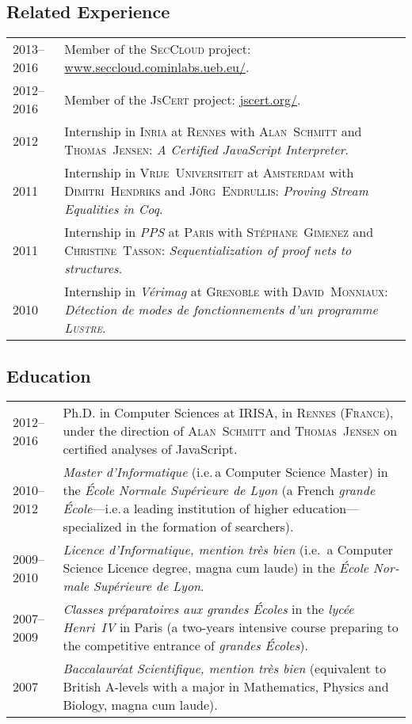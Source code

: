 \documentclass[12pt,a4paper]{article}
\makeatletter
\newcommand{\fr}[1]{\foreignlanguage{french}{\textit{#1}}}
\newcommand{\fr}[1]{\foreignlanguage{francais}{\textit{#1}}}
\newcommand{\ie}{i.e.\,}
\newenvironment{datecvsection}[1]%
               {\subsection*{#1}%
                 \noindent \begin{tabular}{@{}p{\annee}p{\texte}@{}}}
               {\end{tabular}}
\makeatother
\begin{document}
\begin{datecvsection}{Related Experience}

	2013–2016 & Member of the \textsc{SecCloud} project:  \url{www.seccloud.cominlabs.ueb.eu/}. \\

	2012–2016 & Member of the \textsc{JsCert} project:  \url{jscert.org/}. \\

	2012 & Internship in \textsc{Inria} at \textsc{Rennes} with \textsc{Alan~Schmitt} and \textsc{Thomas~Jensen}:
	\textit{A Certified JavaScript Interpreter}. \\

	2011 & Internship in \textsc{Vrĳe~Universiteit} at \textsc{Amsterdam} with \textsc{Dimitri~Hendriks} and \textsc{Jörg~Endrullis}:
	\textit{Proving Stream Equalities in Coq}. \\

	2011 & Internship in \fr{\sc PPS} at \textsc{Paris} with \textsc{Stéphane~Gimenez} and \textsc{Christine~Tasson}:
	\textit{Sequentialization of proof nets to structures}. \\

	2010 & Internship in \fr{\sc Vérimag} at \textsc{Grenoble} with \textsc{David~Monniaux}:
        \fr{Détection de modes de fonctionnements d’un programme \textsc{Lustre}}. \\

\end{datecvsection}

\begin{datecvsection}{Education}

    2012–2016 & Ph.D. in Computer Sciences at \textsc{IRISA}, in \textsc{Rennes} (\textsc{France}), under the direction of \textsc{Alan~Schmitt} and \textsc{Thomas~Jensen} on certified analyses of JavaScript. \\

	2010–2012 & \fr{Master d’Informatique} (\ie a Computer Science
	Master) in the \fr{École Normale Supérieure de Lyon} (a French
	\fr{grande École}—\ie a leading institution of higher
    education—specialized in the formation of searchers). \\

	2009–2010 & \fr{Licence d’Informatique, mention très bien} (\ie
	a Computer Science Licence degree, magna cum laude) in the
	\fr{École Normale Supérieure de Lyon}. \\

	2007–2009 & \fr{Classes préparatoires aux grandes Écoles} in the
	\fr{lycée Henri~IV} in Paris (a two-years intensive course
	preparing to the competitive entrance of \fr{grandes Écoles}). \\

	2007 & \fr{Baccalauréat Scientifique, mention très bien}
	(equivalent to British A-levels with a major in Mathematics, Physics
	and Biology, magna cum laude). \\

\end{datecvsection}
\end{document}
